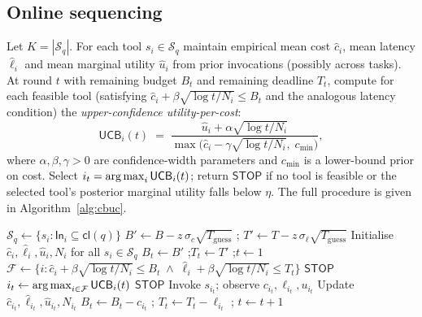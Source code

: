 \subsection{Online sequencing}

Let $K = |\mathcal{S}_q|$. For each tool $s_i \in \mathcal{S}_q$
maintain empirical mean cost $\hat{c}_i$, mean latency $\hat{\ell}_i$
and mean marginal utility $\hat{u}_i$ from prior invocations (possibly
across tasks). At round $t$ with remaining budget $B_t$ and remaining
deadline $T_t$, compute for each feasible tool (satisfying
$\hat{c}_i + \beta \sqrt{\log t / N_i} \le B_t$ and the analogous
latency condition) the \emph{upper-confidence utility-per-cost}:
\begin{equation}
\label{eq:ucb}
  \mathsf{UCB}_i(t)
   \;=\;
   \frac{\hat{u}_i + \alpha \sqrt{\log t / N_i}}
        {\max\!\bigl(\hat{c}_i - \gamma \sqrt{\log t / N_i},\;
                     c_{\min}\bigr)},
\end{equation}
where $\alpha, \beta, \gamma > 0$ are confidence-width parameters and
$c_{\min}$ is a lower-bound prior on cost. Select
$i_t = \operatorname*{arg\,max}_i \mathsf{UCB}_i(t)$; return $\mathsf{STOP}$ if no tool is
feasible or the selected tool's posterior marginal utility falls below
$\eta$. The full procedure is given in Algorithm~\ref{alg:cbuc}.

\begin{algorithm}[t]
\caption{\CBUC: Cost-Budgeted Upper Confidence}
\label{alg:cbuc}
\begin{algorithmic}[1]
\State $\mathcal{S}_q \gets \{s_i : \mathsf{In}_i \subseteq \mathsf{cl}(q)\}$
\State $B' \gets B - z\,\sigma_c \sqrt{T_{\text{guess}}}$ ;\quad
       $T' \gets T - z\,\sigma_\ell \sqrt{T_{\text{guess}}}$
\State Initialise $\hat{c}_i, \hat{\ell}_i, \hat{u}_i, N_i$ for all
       $s_i \in \mathcal{S}_q$
\State $B_t \gets B'$ ;\quad $T_t \gets T'$ ;\quad $t \gets 1$
  \State $\mathcal{F} \gets \{i :
     \hat{c}_i + \beta\sqrt{\log t / N_i} \le B_t
     \;\land\;
     \hat{\ell}_i + \beta\sqrt{\log t / N_i} \le T_t\}$
    \State \Return $\mathsf{STOP}$
  \EndIf
  \State $i_t \gets \operatorname*{arg\,max}_{i \in \mathcal{F}}
     \mathsf{UCB}_i(t)$ 
    \State \Return $\mathsf{STOP}$
  \EndIf
  \State Invoke $s_{i_t}$; observe $c_{i_t}, \ell_{i_t}, u_{i_t}$
  \State Update $\hat{c}_{i_t}, \hat{\ell}_{i_t},
                \hat{u}_{i_t}, N_{i_t}$
  \State $B_t \gets B_t - c_{i_t}$ ;\quad
         $T_t \gets T_t - \ell_{i_t}$ ;\quad
         $t \gets t + 1$
\EndWhile
\end{algorithmic}
\end{algorithm}


